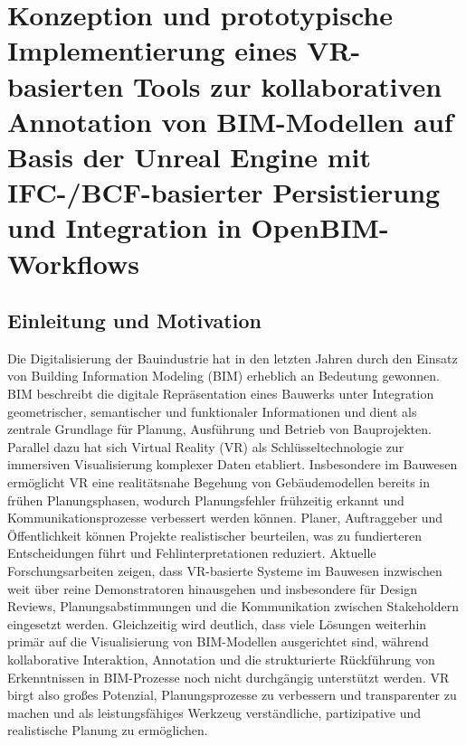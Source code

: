 \chapter{Konzeption und prototypische Implementierung eines VR-basierten Tools zur kollaborativen Annotation von BIM-Modellen auf Basis der Unreal Engine mit IFC-/BCF-basierter Persistierung und Integration in OpenBIM-Workflows}

\section{Einleitung und Motivation}

Die Digitalisierung der Bauindustrie hat in den letzten Jahren durch den Einsatz von Building Information Modeling (BIM) erheblich an Bedeutung gewonnen.
BIM beschreibt die digitale Repräsentation eines Bauwerks unter Integration geometrischer, semantischer und funktionaler Informationen und dient als zentrale Grundlage für Planung, Ausführung und Betrieb von Bauprojekten.\cite{Eastman2011}
Parallel dazu hat sich Virtual Reality (VR) als Schlüsseltechnologie zur immersiven Visualisierung komplexer Daten etabliert.
Insbesondere im Bauwesen ermöglicht VR eine realitätsnahe Begehung von Gebäudemodellen bereits in frühen Planungsphasen, wodurch Planungsfehler frühzeitig erkannt und Kommunikationsprozesse verbessert werden können.
Planer, Auftraggeber und Öffentlichkeit können Projekte realistischer beurteilen, was zu fundierteren Entscheidungen führt und Fehlinterpretationen reduziert.
Aktuelle Forschungsarbeiten zeigen, dass VR-basierte Systeme im Bauwesen inzwischen weit über reine Demonstratoren hinausgehen und insbesondere für Design Reviews, Planungsabstimmungen und die Kommunikation zwischen Stakeholdern eingesetzt werden. Gleichzeitig wird deutlich, dass viele Lösungen weiterhin primär auf die Visualisierung von BIM-Modellen ausgerichtet sind, während kollaborative Interaktion, Annotation und die strukturierte Rückführung von Erkenntnissen in BIM-Prozesse noch nicht durchgängig unterstützt werden.
VR birgt also großes Potenzial, Planungsprozesse zu verbessern und transparenter zu machen und als leistungsfähiges Werkzeug verständliche, partizipative und realistische Planung zu ermöglichen.\cite{Portman2015}

